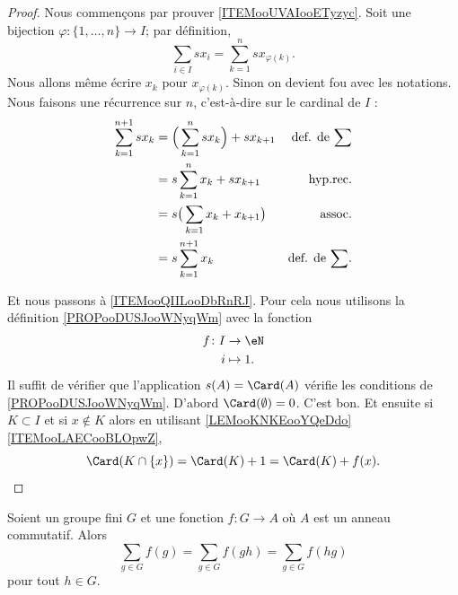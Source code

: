 \begin{proof}
	Nous commençons par prouver \ref{ITEMooUVAIooETyzyc}. Soit une bijection \(\varphi \colon \{ 1,\ldots,n \}\to I  \); par définition,
	\begin{equation}
		\sum_{i\in I}sx_i=\sum_{k=1}^nsx_{\varphi(k)}.
	\end{equation}
	Nous allons même écrire \( x_k\) pour \( x_{\varphi(k)}\). Sinon on devient fou avec les notations. Nous faisons une récurrence sur \( n\), c'est-à-dire sur le cardinal de \( I\) :
	\begin{subequations}
		\begin{align}
			\sum_{k=1}^{n+1}sx_k & =\Big( \sum_{k=1}^nsx_k \Big)+sx_{k+1} & \text{def. de \( \sum\)}  \\
			                     & =s\sum_{k=1}^nx_k+sx_{k+1}             & \text{hyp.rec.}           \\
			                     & =s\big( \sum_{k=1}x_k+x_{k+1} \big)    & \text{assoc.}             \\
			                     & =s\sum_{k=1}^{n+1}x_k                  & \text{def. de \( \sum\)}.
		\end{align}
	\end{subequations}

	Et nous passons à \ref{ITEMooQIILooDbRnRJ}. Pour cela nous utilisons la définition \ref{PROPooDUSJooWNyqWm} avec la fonction
	\begin{equation}
		\begin{aligned}
			f\colon I & \to \eN    \\
			i         & \mapsto 1.
		\end{aligned}
	\end{equation}
	Il suffit de vérifier que l'application \( s(A)=\Card(A)\) vérifie les conditions de \ref{PROPooDUSJooWNyqWm}. D'abord \( \Card(\emptyset)=0\). C'est bon. Et ensuite si \( K\subset I\) et si \( x\not\in K\) alors en utilisant \ref{LEMooKNKEooYQeDdo}\ref{ITEMooLAECooBLOpwZ},
	\begin{equation}
		\Card(K\cap\{ x \})=\Card(K)+1=\Card(K)+f(x).
	\end{equation}
\end{proof}

\begin{proposition}     \label{PROPooWJQQooFINSEc}
	Soient un groupe fini \( G\) et une fonction \( f\colon G\to A\) où \( A\) est un anneau commutatif. Alors
	\begin{equation}
		\sum_{g\in G}f(g)=\sum_{g\in G}f(gh)=\sum_{g\in G}f(hg)
	\end{equation}
	pour tout \( h\in G\).
\end{proposition}

